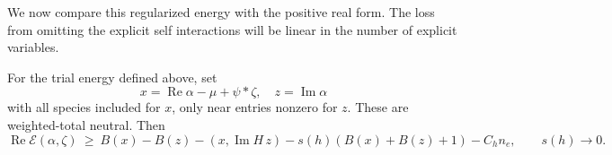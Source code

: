 We now compare this regularized energy with the positive real form.
The loss from omitting the explicit self interactions will be linear
in the number of explicit variables.

\begin{lemma}\label{lem:03-smoothing}
For the trial energy defined above, set
\[
 x=\operatorname{Re}\alpha-\mu+\psi*\zeta,\quad z=\operatorname{Im}\alpha
\]
with all species included for \(x\), only near entries nonzero for \(z\). These are weighted-total neutral. Then
\begin{equation}
 \operatorname{Re}\mathcal E(\alpha,\zeta)
 \ \ge\ B(x)-B(z)-(x,\operatorname{Im}H\,z)
 -s(h)(B(x)+B(z)+1)-C_h n_e,\qquad s(h)\longrightarrow0.
 \label{eq:G-1}
\end{equation}

\end{lemma}

